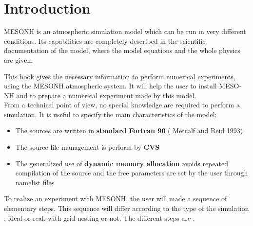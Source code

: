\chapter{ Introduction}

\indent MESONH is an atmospheric simulation model which can be run in very different
conditions. Its capabilities are completely described in the scientific
documentation of the model, where the model equations and the whole
physics are given.  

This book gives the  necessary information to perform
numerical experiments, using the MESONH atmospheric system. 
It will help the user to install MESO-NH and to prepare 
a numerical experiment made by this model.\\

From a technical point of view, no special knowledge are required to perform a
simulation. It is useful to specify the main characteristics of
the model: 
\begin{itemize}
\item
The sources are written in {\bf standard Fortran 90} ( Metcalf and Reid 1993)
\item
The source file management is perform by {\bf CVS }
\item
The generalized use of {\bf  dynamic memory allocation} avoids  repeated 
compilation of the source and the free parameters are set by the user
 through namelist files
\end{itemize}

To realize an experiment with MESONH, the user will made a sequence of elementary steps. This sequence will differ according to the type of the simulation : ideal or real, with grid-nesting or not. The different steps  are :

